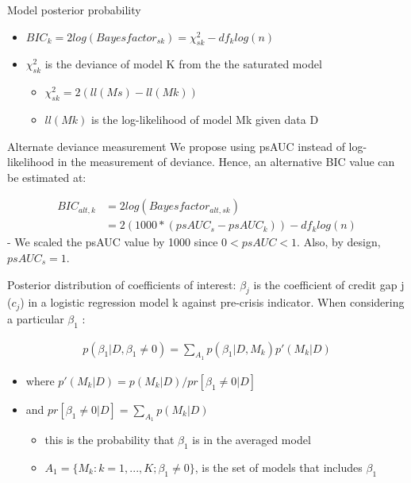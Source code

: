 \documentclass[
  ignorenonframetext,
]{beamer}
\providecommand{\tightlist}{%
  \setlength{\itemsep}{0pt}\setlength{\parskip}{0pt}}
\begin{document}
\begin{frame}{Model posterior probability}
\protect\hypertarget{model-posterior-probability-1}{}
\begin{itemize}
\tightlist
\item
  \(BIC_k = 2log (Bayesfactor_{sk}) = \chi^2_{sk} - df_klog(n)\)
\item
  \(\chi^2_{sk}\) is the deviance of model K from the the saturated
  model

  \begin{itemize}
  \tightlist
  \item
    \(\chi^2_{sk} = 2(ll(Ms) - ll(Mk))\)
  \item
    \(ll(Mk)\) is the log-likelihood of model Mk given data D
  \end{itemize}
\end{itemize}

\begin{block}{Alternate deviance measurement}
\protect\hypertarget{alternate-deviance-measurement}{}
We propose using psAUC instead of log-likelihood in the measurement of
deviance. Hence, an alternative BIC value can be estimated at:

\begin{align}
BIC_{alt,k} &= 2log (Bayesfactor_{alt,sk}) \\
&= 2(1000*(psAUC_s-psAUC_k)) - df_klog(n)
\end{align} - We scaled the psAUC value by 1000 since \(0<psAUC<1\).
Also, by design, \(psAUC_s=1\).
\end{block}
\end{frame}

\begin{frame}{Posterior distribution of coefficients of interest:}
\protect\hypertarget{posterior-distribution-of-coefficients-of-interest}{}
\(\beta_j\) is the coefficient of credit gap j (\(c_j\)) in a logistic
regression model k against pre-crisis indicator. When considering a
particular \(\beta_1\) :

\begin{align*}
p(\beta_1|D, \beta_1\ne 0) = \sum\nolimits_{A_1} p(\beta_1|D,M_k)p'(M_k|D)
\end{align*}

\begin{itemize}
\tightlist
\item
  where \(p'(M_k|D)=p(M_k|D)/ pr[\beta_1 \ne 0|D]\)
\item
  and \(pr[\beta_1 \ne 0|D] = \sum\limits_{A_1} p(M_k|D)\)

  \begin{itemize}
  \tightlist
  \item
    this is the probability that \(\beta_1\) is in the averaged model
  \item
    \(A_1= \{M_k: k=1,...,K; \beta_1 \ne 0\}\), is the set of models
    that includes \(\beta_1\)
  \end{itemize}
\end{itemize}
\end{frame}
\end{document}
